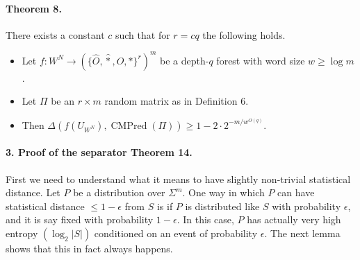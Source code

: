 \documentclass[10pt,a4paper]{article}
\begin{document}
\paragraph{Theorem 8.}
There exists a constant $c$ such that for $r=cq$ the following holds.
\begin{itemize}
\item Let $f:W^N\to(\{\widehat O,\widehat *,O,*\}^r)^m$ be a depth-$q$ forest with word size $w\geq\log m$.
\item Let $\Pi$ be an $r\times m$ random matrix as in Definition 6.
\item Then $\Delta(f(U_{W^N}),\operatorname{CMPred}(\Pi))\geq1-2\cdot2^{-m/w^{O(q)}}$.
\end{itemize}

\paragraph{3. Proof of the separator Theorem 14.}
First we need to understand what it means to have slightly non-trivial statistical distance. Let $P$ be a distribution over $\Sigma^m$. One way in which $P$ can have statistical distance $\leq1-\epsilon$ from $S$ is if $P$ is distributed like $S$ with probability $\epsilon$, and it is say fixed with probability $1-\epsilon$. In this case, $P$ has actually very high entropy $(\log_2|S|)$ conditioned on an event of probability $\epsilon$. The next lemma shows that this in fact always happens.
\end{document}
